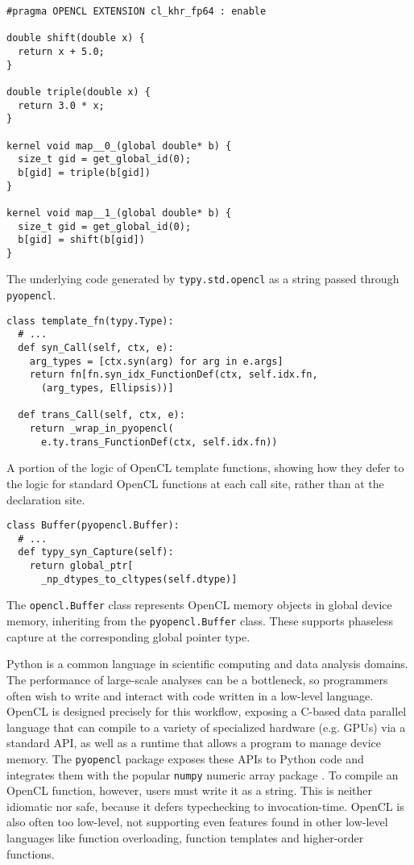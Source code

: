 \documentclass[preprint,10pt]{sigplanconf}
\newcommand{\lip}[1]{\lstinline[language=Python,basicstyle=\ttfamily\small,deletendkeywords={tuple,buffer,map}]{#1}}
\begin{document}
\begin{codelisting}[t]
\begin{lstlisting}[style=OpenCL]
#pragma OPENCL EXTENSION cl_khr_fp64 : enable

double shift(double x) {
  return x + 5.0;
}

double triple(double x) {
  return 3.0 * x;
}

kernel void map__0_(global double* b) {
  size_t gid = get_global_id(0); 
  b[gid] = triple(b[gid])
}

kernel void map__1_(global double* b) {
  size_t gid = get_global_id(0);
  b[gid] = shift(b[gid])
}
\end{lstlisting}
\caption{The underlying code generated by \texttt{typy.std.opencl} as a string passed through \texttt{pyopencl}.}
\label{example-opencl-out}
\end{codelisting}
\begin{codelisting}[t]
\begin{lstlisting}
class template_fn(typy.Type):
  # ...
  def syn_Call(self, ctx, e):
    arg_types = [ctx.syn(arg) for arg in e.args]
    return fn[fn.syn_idx_FunctionDef(ctx, self.idx.fn, 
      (arg_types, Ellipsis))]

  def trans_Call(self, ctx, e):
    return _wrap_in_pyopencl(
      e.ty.trans_FunctionDef(ctx, self.idx.fn))
\end{lstlisting}
\caption{A portion of the logic of OpenCL template functions, showing how they defer to the logic for standard OpenCL functions at each call site, rather than at the declaration site.}
\label{example-opencl-templatefn}
\end{codelisting}
\begin{codelisting}[t]
\begin{lstlisting}
class Buffer(pyopencl.Buffer):
  # ...
  def typy_syn_Capture(self):
    return global_ptr[
      _np_dtypes_to_cltypes(self.dtype)]
\end{lstlisting}
\caption{The \texttt{opencl.Buffer} class represents OpenCL memory objects in global device memory, inheriting from the \texttt{pyopencl.Buffer} class. These supports phaseless capture at the corresponding global pointer type.}
\label{example-opencl-buffer}
\end{codelisting}

Python is a common language in scientific computing and data analysis domains. The performance of large-scale analyses can be a bottleneck, so programmers often wish to write and interact with code written in a low-level language. OpenCL is designed precisely for this workflow, exposing a C-based data parallel language that can compile to a variety of specialized hardware (e.g. GPUs) via a standard API, as well as a runtime that allows a program to manage device memory. The \lip{pyopencl} package exposes these APIs to Python code and integrates them with the popular \lip{numpy} numeric array package \cite{klockner2011pycuda}. To compile an OpenCL function, however, users must write it as a string. This is neither idiomatic nor safe, because it defers typechecking to invocation-time. OpenCL is also often too low-level, not supporting even features found in other low-level languages like function overloading, function templates and higher-order functions.
\end{document}
